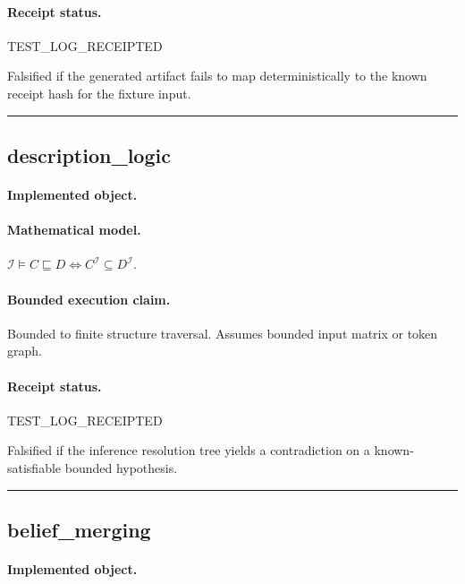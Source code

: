 \paragraph{Receipt status.} TEST\_LOG\_RECEIPTED
\begin{falsifier}
Falsified if the generated artifact fails to map deterministically to the known receipt hash for the fixture input.
\end{falsifier}

\vspace{1em}\hrule\vspace{1em}
\subsection{description\_logic}
\paragraph{Implemented object.} 
\paragraph{Mathematical model.} $\mathcal{I}\models C\sqsubseteq D \iff C^\mathcal{I}\subseteq D^\mathcal{I}.$
\paragraph{Bounded execution claim.} Bounded to finite structure traversal. Assumes bounded input matrix or token graph.
\paragraph{Receipt status.} TEST\_LOG\_RECEIPTED
\begin{falsifier}
Falsified if the inference resolution tree yields a contradiction on a known-satisfiable bounded hypothesis.
\end{falsifier}

\vspace{1em}\hrule\vspace{1em}
\subsection{belief\_merging}
\paragraph{Implemented object.} 
